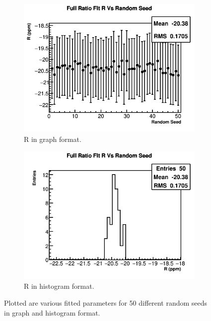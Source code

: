 \begin{figure}[]
		    \begin{subfigure}[t]{0.45\textwidth}
			    \centering
				\includegraphics[width=\textwidth]{RatioCBO_R_Vs_Iter_Canv}
			    \caption{R in graph format.}
		    \end{subfigure}
		    \hspace{4mm}
		    \begin{subfigure}[t]{0.45\textwidth}
			    \centering
				\includegraphics[width=\textwidth]{RatioCBO_R_Vs_Iter_Canv_hist}
			    \caption{R in histogram format.}
		    \end{subfigure}%
		\caption[RandomSeedsPars1]{Plotted are various fitted parameters for 50 different random seeds in graph and histogram format.}
		\label{fig:RandomSeedsPars1}
		\end{figure}

